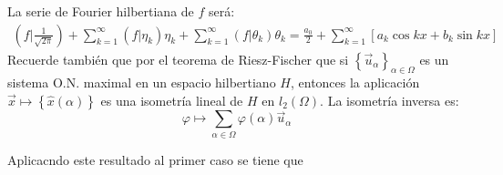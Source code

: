 \documentclass[12pt]{report}
\newcounter{it}
\theoremstyle{largebreak}
\newcommand\pint[2]{\ensuremath{\left(#1\big| #2\right)}}
\begin{document}
    La serie de Fourier hilbertiana de $f$ será:
    \begin{equation*}
        \begin{split}
            \pint{f}{\frac{1}{\sqrt{2\pi}}}+\sum_{ k=1}^\infty \pint{f}{\eta_k}\eta_k+\sum_{ k=1}^\infty \pint{f}{\theta_k}\theta_k=\frac{a_0}{2}+\sum_{ k=1}^\infty\left[a_k\cos kx+b_k\sin kx \right]
        \end{split}
    \end{equation*}
    Recuerde también que por el teorema de Riesz-Fischer que si $\left\{\vec{u}_\alpha \right\}_{\alpha\in\Omega}$ es un sistema O.N. maximal en un espacio hilbertiano $H$, entonces la aplicación $\vec{x}\mapsto\left\{\hat{x}(\alpha) \right\}$ es una isometría lineal de $H$ en $l_2(\Omega)$. La isometría inversa es:
    \begin{equation*}
        \varphi\mapsto \sum_{\alpha\in\Omega}\varphi(\alpha)\vec{u}_\alpha
    \end{equation*}

    Aplicacndo este resultado al primer caso se tiene que
\end{document}
